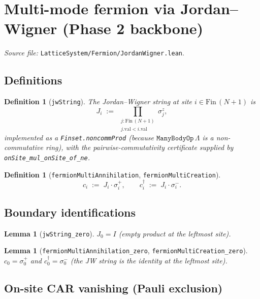 \documentclass[a4paper,11pt]{article}
\newtheorem{lemma}[theorem]{Lemma}
\newtheorem{definition}[theorem]{Definition}
\begin{document}
\section{Multi-mode fermion via Jordan–Wigner (Phase 2 backbone)}
\label{sec:fermion-jw}

\emph{Source file:} \texttt{LatticeSystem/Fermion/JordanWigner.lean}.

\subsection{Definitions}

\begin{definition}[\texttt{jwString}]
The Jordan–Wigner string at site $i \in \mathrm{Fin}\,(N+1)$ is
\[
  J_i \;:=\; \prod_{\substack{j : \mathrm{Fin}\,(N+1) \\ j.\mathrm{val} < i.\mathrm{val}}}
              \sigma^z_j,
\]
implemented as a \texttt{Finset.noncommProd} (because
$\texttt{ManyBodyOp}\,\Lambda$ is a non-commutative ring), with the
pairwise-commutativity certificate supplied by
\texttt{onSite\_mul\_onSite\_of\_ne}.
\end{definition}

\begin{definition}[\texttt{fermionMultiAnnihilation}, \texttt{fermionMultiCreation}]
\[
  c_i \;:=\; J_i \cdot \sigma^+_i,
  \qquad
  c_i^\dagger \;:=\; J_i \cdot \sigma^-_i.
\]
\end{definition}

\subsection{Boundary identifications}

\begin{lemma}[\texttt{jwString\_zero}]
$J_0 = I$ (empty product at the leftmost site).
\end{lemma}

\begin{lemma}[\texttt{fermionMultiAnnihilation\_zero}, \texttt{fermionMultiCreation\_zero}]
$c_0 = \sigma^+_0$ and $c_0^\dagger = \sigma^-_0$ (the JW string is
the identity at the leftmost site).
\end{lemma}

\subsection{On-site CAR vanishing (Pauli exclusion)}
\end{document}
